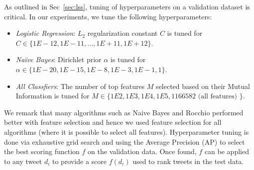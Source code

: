 As outlined in Sec~\ref{sec:lss}, tuning of hyperparameters on a validation
dataset is critical.  In our experiments, we tune the following hyperparameters:
\begin{itemize}
\item \textit{Logistic Regression}: $L_2$ regularization constant $C$ is tuned for $C \in \{1E-12, 1E-11, ..., 1E+11, 1E+12\}$.
\item \textit{Na\"{i}ve Bayes}: Dirichlet prior $\alpha$ is tuned for $\alpha \in \{1E-20, 1E-15, 1E-8, 1E-3, 1E-1, 1\}$.
\item \textit{All Classfiers}: The number of top features $M$ selected based on their Mutual Information is tuned for $M \in \{1E2, 1E3, 1E4, 1E5, 1166582 \textrm{ (all features) } \}$.
\end{itemize}
We remark that many algorithms such as Naive Bayes and Rocchio
performed better with feature selection and hence we used feature
selection for all algorithms (where it is possible to select all
features).  Hyperparameter tuning is done via exhaustive grid search
and using the Average Precision
(AP) to select the best scoring function $f$ on the validation data.
Once found, $f$ can be applied to any tweet $d_i$ to provide a score $f(d_i)$
used to rank tweets in the test data.
%
%
